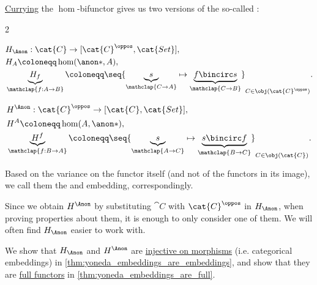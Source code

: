 \begin{definition}\label{def:yoneda_embeddings}
  \hyperref[con:currying]{Currying} the \( \hom \)-bifunctor gives us two versions of the so-called :
  \begin{paracol}{2}
    \ParacolAlignmentHack
    \begin{leftcolumn}
      \begin{equation*}
        \begin{aligned}
          &H_{\Anon}: \cat{C} \to [\cat{C}^\oppos, \cat{Set}], \\
          &H_A \coloneqq \hom(\anon*, A), \\
          &\underbrace{H_f}_{\mathclap{f: A \to B}} \coloneqq \seq{ \underbrace{s}_{\mathclap{C \to A}} \mapsto \underbrace{f \bincirc s}_{\mathclap{C \to B}} }_{C \in \obj(\cat{C}^\oppos)}.
        \end{aligned}
      \end{equation*}
    \end{leftcolumn}

    \begin{rightcolumn}
      \ParacolAlignmentHack
      \begin{equation*}
        \begin{aligned}
          &H^{\Anon}: \cat{C}^\oppos \to [\cat{C}, \cat{Set}], \\
          &H^A \coloneqq \hom(A, \anon*), \\
          &\underbrace{H^f}_{\mathclap{f: B \to A}} \coloneqq \seq{ \underbrace{s}_{\mathclap{A \to C}} \mapsto \underbrace{s \bincirc f}_{\mathclap{B \to C}} }_{C \in \obj(\cat{C})}.
        \end{aligned}
      \end{equation*}
    \end{rightcolumn}
  \end{paracol}

  Based on the variance on the functor itself (and not of the functors in its image), we call them the  and  embedding, correspondingly.
\end{definition}
\begin{comments}
  \item Since we obtain \( H^{\Anon} \) by substituting \( \cat{C} \) with \( \cat{C}^\oppos \) in \( H_{\Anon} \), when proving properties about them, it is enough to only consider one of them. We will often find \( H_{\Anon} \) easier to work with.

  \item We show that \( H_{\Anon} \) and \( H^{\Anon} \) are \hyperref[def:functor_invertibility/injective]{injective on morphisms} (i.e. categorical embeddings) in \cref{thm:yoneda_embeddings_are_embeddings}, and show that they are \hyperref[def:functor_invertibility/full]{full functors} in \cref{thm:yoneda_embeddings_are_full}.
\end{comments}
